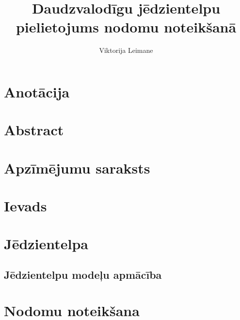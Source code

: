 \documentclass[12pt,oneside]{LuThesis}
\title{Daudzvalodīgu jēdzientelpu pielietojums nodomu noteikšanā}
\author{Viktorija Leimane}
\begin{document}
\maketitle

\chapter*{Anotācija}
\setcounter{page}{1}
\begin{abstract}

\end{abstract}

\chapter*{Abstract}
\begin{english}
\begin{abstract}

\end{abstract}
\end{english}

\tableofcontents


\chapter*{Apzīmējumu saraksts}



\chapter*{Ievads}



%

\chapter{Jēdzientelpa}


\section{Jēdzientelpu modeļu apmācība}


\chapter{Nodomu noteikšana}

\end{document}
